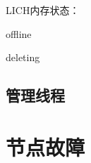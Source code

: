 LICH内存状态：
\begin{enumbox}
\item offline
\item deleting
\end{enumbox}

\subsection{管理线程}

\section{节点故障}
